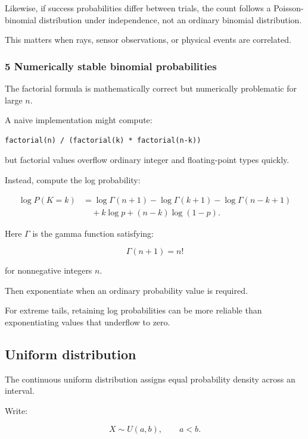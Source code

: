Likewise, if success probabilities differ between trials, the count follows a Poisson-binomial distribution under independence, not an ordinary binomial distribution.

This matters when rays, sensor observations, or physical events are correlated.

\subsubsection{5 Numerically stable binomial probabilities}\label{02-foundations-ii-ch023-numerically-stable-binomial-probabilities}

The factorial formula is mathematically correct but numerically problematic for large \(n\).

A naive implementation might compute:

\begin{verbatim}
factorial(n) / (factorial(k) * factorial(n-k))
\end{verbatim}

but factorial values overflow ordinary integer and floating-point types quickly.

Instead, compute the log probability:

\[
 \begin{aligned} \log P(K=k) &= \log\Gamma(n+1) -\log\Gamma(k+1) -\log\Gamma(n-k+1)\\ &\quad+k\log p+(n-k)\log(1-p). \end{aligned}
\]

Here \(\Gamma\) is the gamma function satisfying:

\[
 \Gamma(n+1)=n!
\]

for nonnegative integers \(n\).

Then exponentiate when an ordinary probability value is required.

For extreme tails, retaining log probabilities can be more reliable than exponentiating values that underflow to zero.

\subsection{Uniform distribution}\label{02-foundations-ii-ch023-uniform-distribution}

The continuous uniform distribution assigns equal probability density across an interval.

Write:

\[
 X\sim U(a,b), \qquad a<b.
\]

